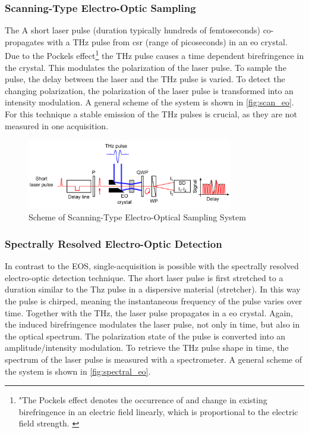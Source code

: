 \subsubsection*{Scanning-Type Electro-Optic Sampling}
The 
A short laser pulse (duration typically hundreds of femtoseconds) co-propagates with a THz pulse from \gls{csr} (range of picoseconds) in an \gls{eo} crystal. Due to the Pockels effect\footnote{"The Pockels effect denotes the occurrence of
	and change in existing birefringence in an electric field linearly, which is proportional to the electric
	field strength. \cite{pockels}} the THz pulse causes a time dependent birefringence in the crystal.
This modulates the polarization of the laser pulse.
To sample the pulse, the delay between the laser and the THz pulse is varied.
To detect the changing polarization, the polarization of the laser pulse is transformed into an intensity modulation.
A general scheme of the system is shown in \autoref{fig:scan_eo}.
For this technique a stable emission of the THz pulses is crucial, as they are not measured in one acquisition. \cite{roussel2014}
\begin{figure}[tbh]
	\centering
	\includegraphics[width = 0.8\textwidth]{chap/02-theory/img/scanning_eo}
	\caption{Scheme of Scanning-Type Electro-Optical Sampling System \cite{roussel2014}}
	\label{fig:scan_eo}
\end{figure}

\subsubsection*{Spectrally Resolved Electro-Optic Detection}
In contrast to the EOS, single-acquisition is possible with the spectrally resolved electro-optic detection technique. %
The short laser pulse is first stretched to a duration similar to the Thz pulse in a dispersive material (stretcher).
In this way the pulse is chirped, meaning the instantaneous frequency of the pulse varies over time.
Together with the THz, the laser pulse propagates in a \gls{eo} crystal.
Again, the induced birefringence modulates the laser pulse, not only in time, but also in the optical spectrum.
The polarization state of the pulse is converted into an amplitude/intensity modulation.
To retrieve the THz pulse shape in time, the spectrum of the laser pulse is measured with a spectrometer. %
A general scheme of the system is shown in \autoref{fig:spectral_eo}. \cite{roussel2014}

